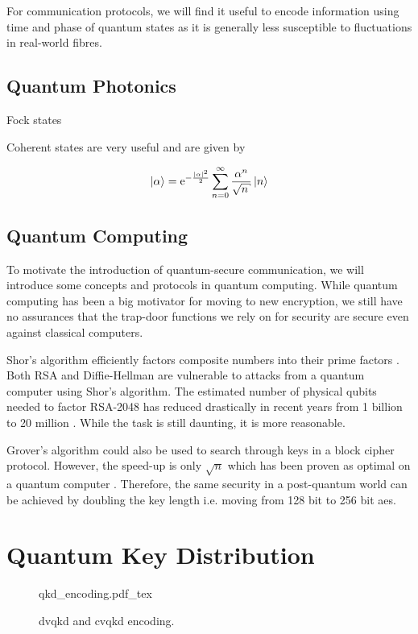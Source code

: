 For communication protocols, we will find it useful to encode information using time and phase of quantum states as it is generally less susceptible to fluctuations in real-world fibres.

\subsection{Quantum Photonics}

Fock states

Coherent states are very useful and are given by

\begin{equation}
	\ket{\alpha} = \mathrm{e}^{-\frac{|\alpha|^2}{2}} \sum_{n=0}^\infty \frac{\alpha^n}{\sqrt{n}} \ket{n} 
\end{equation}

\subsection{Quantum Computing}

To motivate the introduction of quantum-secure communication, we will introduce some concepts and protocols in quantum computing. While quantum computing has been a big motivator for moving to new encryption, we still have no assurances that the trap-door functions we rely on for security are secure even against classical computers.

Shor's algorithm efficiently factors composite numbers into their prime factors \cite{shor1994}. Both RSA and Diffie-Hellman are vulnerable to attacks from a quantum computer using Shor's algorithm. The estimated number of physical qubits needed to factor RSA-2048 has reduced drastically in recent years from 1 billion \cite{mosca2018, fowler2012} to 20 million \cite{gidney2019}. While the task is still daunting, it is more reasonable.

Grover's algorithm could also be used to search through keys in a block cipher protocol. However, the speed-up is only $\sqrt{n}$ which has been proven as optimal on a quantum computer \cite{Bennent1997} . Therefore, the same security in a post-quantum world can be achieved by doubling the key length i.e. moving from 128 bit to 256 bit \ac{aes}.

\section{Quantum Key Distribution}

\begin{figure}
	\centering
	\def\svgwidth{0.9\textwidth}
   	{qkd_encoding.pdf_tex}
   	\caption[\acs{dvqkd} and \acs{cvqkd} encoding]{\acs{dvqkd} and \acs{cvqkd} encoding.}
\end{figure}

